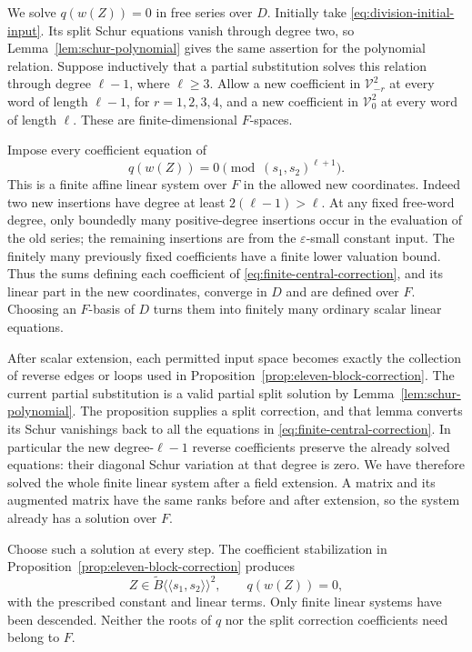 \documentclass[11pt]{article}
\theoremstyle{definition}
\theoremstyle{remark}
\numberwithin{equation}{section}
\begin{document}
We solve $q(w(Z))=0$ in free series over $D$.  Initially take
\eqref{eq:division-initial-input}.  Its split Schur equations vanish
through degree two, so Lemma~\ref{lem:schur-polynomial} gives the same
assertion for the polynomial relation.  Suppose inductively that a
partial substitution solves this relation through degree $\ell-1$,
where $\ell\ge3$.  Allow a new coefficient in
$\mathcal V_{-r}^2$ at every word of length $\ell-1$, for
$r=1,2,3,4$, and a new coefficient in $\mathcal V_0^2$ at every word
of length $\ell$.  These are finite-dimensional $F$-spaces.

Impose every coefficient equation of
\begin{equation}
 q(w(Z))=0\pmod{(s_1,s_2)^{\ell+1}}.
 \label{eq:finite-central-correction}
\end{equation}
This is a finite affine linear system over $F$ in the allowed new
coordinates.  Indeed two new insertions have degree at least
$2(\ell-1)>\ell$.  At any fixed free-word degree, only boundedly
many positive-degree insertions occur in the evaluation of the old
series; the remaining insertions are from the $\varepsilon$-small
constant input.  The finitely many previously fixed coefficients have
a finite lower valuation bound.  Thus the sums defining each
coefficient of \eqref{eq:finite-central-correction}, and its linear
part in the new coordinates, converge in $D$ and are defined over $F$.
Choosing an $F$-basis of $D$ turns them into finitely many ordinary
scalar linear equations.

After scalar extension, each permitted input space becomes exactly
the collection of reverse edges or loops used in
Proposition~\ref{prop:eleven-block-correction}.  The current partial
substitution is a valid partial split solution by
Lemma~\ref{lem:schur-polynomial}.  The proposition supplies a split
correction, and that lemma converts its Schur vanishings back to all
the equations in \eqref{eq:finite-central-correction}.  In particular
the new degree-$\ell-1$ reverse coefficients preserve the already
solved equations: their diagonal Schur variation at that degree is
zero.  We have therefore solved the whole finite linear system after
a field extension.  A matrix and its augmented matrix have the same
ranks before and after extension, so the system already has a solution
over $F$.

Choose such a solution at every step.  The coefficient stabilization
in Proposition~\ref{prop:eleven-block-correction} produces
\[
 Z\in\widetilde B\langle\!\langle s_1,s_2\rangle\!\rangle^2,
 \qquad q(w(Z))=0,
\]
with the prescribed constant and linear terms.  Only finite linear
systems have been descended.  Neither the roots of $q$ nor the split
correction coefficients need belong to $F$.
\end{document}
